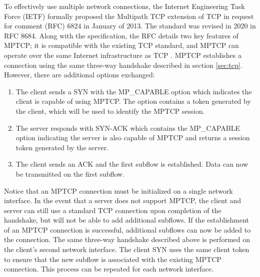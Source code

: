 \documentclass[sigplan,screen,nonacm]{acmart}
\begin{document}
To effectively use multiple network connections, the Internet Engineering Task Force (IETF) formally proposed the Multipath TCP extension of TCP in request for comment (RFC) 6824 in January of 2013. The standard was revised in 2020 in RFC 8684. Along with the specification, the RFC details two key features of MPTCP; it is compatible with the existing TCP standard, and MPTCP can operate over the same Internet infrastructure as TCP \cite{MPTCPoverview:2012}. MPTCP establishes a connection using the same three-way handshake described in section \ref{sec:tcp}. However, there are additional options exchanged:
\begin{enumerate}
  \item The client sends a SYN with the MP\_CAPABLE option which indicates the client is capable of using MPTCP. The option contains a token generated by the client, which will be used to identify the MPTCP session.
  \item The server responds with SYN-ACK which contains the MP\_CAPABLE option indicating the server is also capable of MPTCP and returns a session token generated by the server.
  \item The client sends an ACK and the first subflow is established. Data can now be transmitted on the first subflow.
\end{enumerate}
Notice that an MPTCP connection must be initialized on a single network interface. In the event that a server does not support MPTCP, the client and server can still use a standard TCP connection upon completion of the handshake, but will not be able to add additional subflows. If the establishment of an MPTCP connection is successful, additional subflows can now be added to the connection. The same three-way handshake described above is performed on the client’s second network interface. The client SYN uses the same client token to ensure that the new subflow is associated with the existing MPTCP connection. This process can be repeated for each network interface.
\end{document}
